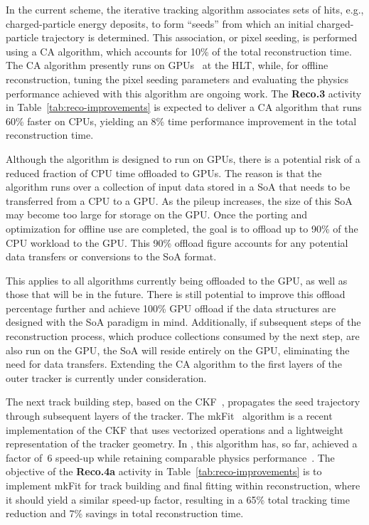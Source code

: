 In the current scheme, the iterative tracking algorithm associates sets of hits, e.g., charged-particle energy deposits,  to form ``seeds'' from which an initial charged-particle trajectory is determined. This association, or pixel seeding, is performed using a \gls{CA} algorithm, which accounts for 10\% of the total reconstruction time. The \gls{CA} algorithm presently runs on \glspl{GPU}~\cite{Bocci:2020pmi} at the \gls{HLT}, while, for offline reconstruction, tuning the pixel seeding parameters and evaluating the physics performance achieved with this algorithm are ongoing work. The \textbf{Reco.3} activity in Table~\ref{tab:reco-improvements} is expected to deliver a \gls{CA} algorithm that runs 60\% faster on \glspl{CPU}, yielding an 8\% time performance improvement in the total reconstruction time. 

Although the algorithm is designed to run on \glspl{GPU}, there is a potential risk of a reduced fraction of \gls{CPU} time offloaded to \glspl{GPU}. The reason is that the algorithm runs over a collection of input data stored in a \gls{SoA} that needs to be transferred from a \gls{CPU} to a \gls{GPU}. As the pileup increases, the size of this \gls{SoA} may become too large for storage on the \gls{GPU}. Once the porting and optimization for offline use are completed, the goal is to offload up to 90\% of the \gls{CPU} workload to the \gls{GPU}. This 90\% offload figure accounts for any potential data transfers or conversions to the \gls{SoA} format. 

This applies to all algorithms currently being offloaded to the \gls{GPU}, as well as those that will be in the future. There is still potential to improve this offload percentage further and achieve 100\% \gls{GPU} offload if the data structures are designed with the \gls{SoA} paradigm in mind. Additionally, if subsequent steps of the reconstruction process, which produce collections consumed by the next step, are also run on the \gls{GPU}, the \gls{SoA} will reside entirely on the \gls{GPU}, eliminating the need for data transfers.
Extending the \gls{CA} algorithm to the first layers of the \PhaseTwo outer tracker is currently under consideration.

The next track building step, based on the \gls{CKF}~\cite{CMS:2014pgm}, propagates the seed trajectory through subsequent layers of the tracker.
The mkFit~\cite{Lantz:2020yqe} algorithm is a recent implementation of the \gls{CKF} that uses vectorized operations and a lightweight representation of the tracker geometry. In \RunThree, this algorithm has, so far, achieved a factor of~6 speed-up while retaining comparable physics performance~\cite{CMS-DP-2022-018}. The objective of the \textbf{Reco.4a} activity in Table~\ref{tab:reco-improvements} is to implement mkFit for track building and final fitting within \PhaseTwo reconstruction, where it should yield a similar speed-up factor, resulting in a 65\% total tracking time reduction and 7\% savings in total reconstruction time. 

